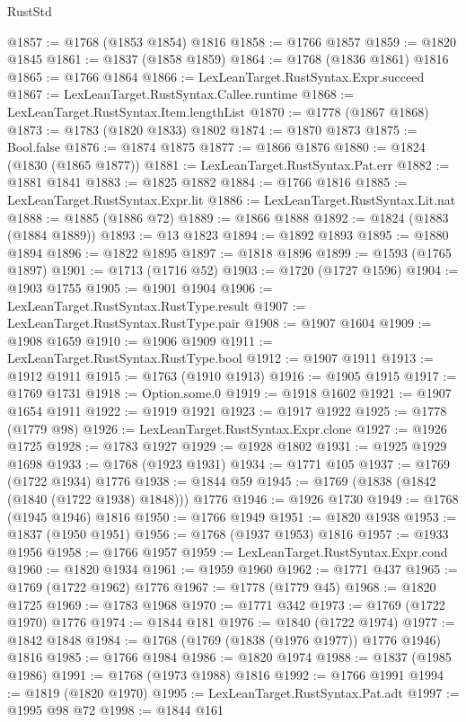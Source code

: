 \begin{lexlean}{RustStd}
\begin{coremodule}
{\begin{coremodule}
{{{{{{{{{{{{{{{{{{{{{{{{{{{{{{{{{{{{{{{{{{{{{{{@1857 := @1768 (@1853 @1854) @1816
@1858 := @1766 @1857
@1859 := @1820 @1845
@1861 := @1837 (@1858 @1859)
@1864 := @1768 (@1836 @1861) @1816
@1865 := @1766 @1864
@1866 := LexLeanTarget.RustSyntax.Expr.succeed
@1867 := LexLeanTarget.RustSyntax.Callee.runtime
@1868 := LexLeanTarget.RustSyntax.Item.lengthList
@1870 := @1778 (@1867 @1868)
@1873 := @1783 (@1820 @1833) @1802
@1874 := @1870 @1873
@1875 := Bool.false
@1876 := @1874 @1875
@1877 := @1866 @1876
@1880 := @1824 (@1830 (@1865 @1877))
@1881 := LexLeanTarget.RustSyntax.Pat.err
@1882 := @1881 @1841
@1883 := @1825 @1882
@1884 := @1766 @1816
@1885 := LexLeanTarget.RustSyntax.Expr.lit
@1886 := LexLeanTarget.RustSyntax.Lit.nat
@1888 := @1885 (@1886 @72)
@1889 := @1866 @1888
@1892 := @1824 (@1883 (@1884 @1889))
@1893 := @13 @1823
@1894 := @1892 @1893
@1895 := @1880 @1894
@1896 := @1822 @1895
@1897 := @1818 @1896
@1899 := @1593 (@1765 @1897)
@1901 := @1713 (@1716 @52)
@1903 := @1720 (@1727 @1596)
@1904 := @1903 @1755
@1905 := @1901 @1904
@1906 := LexLeanTarget.RustSyntax.RustType.result
@1907 := LexLeanTarget.RustSyntax.RustType.pair
@1908 := @1907 @1604
@1909 := @1908 @1659
@1910 := @1906 @1909
@1911 := LexLeanTarget.RustSyntax.RustType.bool
@1912 := @1907 @1911
@1913 := @1912 @1911
@1915 := @1763 (@1910 @1913)
@1916 := @1905 @1915
@1917 := @1769 @1731
@1918 := Option.some.{0}
@1919 := @1918 @1602
@1921 := @1907 @1654 @1911
@1922 := @1919 @1921
@1923 := @1917 @1922
@1925 := @1778 (@1779 @98)
@1926 := LexLeanTarget.RustSyntax.Expr.clone
@1927 := @1926 @1725
@1928 := @1783 @1927
@1929 := @1928 @1802
@1931 := @1925 @1929 @1698
@1933 := @1768 (@1923 @1931)
@1934 := @1771 @105
@1937 := @1769 (@1722 @1934) @1776
@1938 := @1844 @59
@1945 := @1769 (@1838 (@1842 (@1840 (@1722 @1938) @1848))) @1776
@1946 := @1926 @1730
@1949 := @1768 (@1945 @1946) @1816
@1950 := @1766 @1949
@1951 := @1820 @1938
@1953 := @1837 (@1950 @1951)
@1956 := @1768 (@1937 @1953) @1816
@1957 := @1933 @1956
@1958 := @1766 @1957
@1959 := LexLeanTarget.RustSyntax.Expr.cond
@1960 := @1820 @1934
@1961 := @1959 @1960
@1962 := @1771 @437
@1965 := @1769 (@1722 @1962) @1776
@1967 := @1778 (@1779 @45)
@1968 := @1820 @1725
@1969 := @1783 @1968
@1970 := @1771 @342
@1973 := @1769 (@1722 @1970) @1776
@1974 := @1844 @181
@1976 := @1840 (@1722 @1974)
@1977 := @1842 @1848
@1984 := @1768 (@1769 (@1838 (@1976 @1977)) @1776 @1946) @1816
@1985 := @1766 @1984
@1986 := @1820 @1974
@1988 := @1837 (@1985 @1986)
@1991 := @1768 (@1973 @1988) @1816
@1992 := @1766 @1991
@1994 := @1819 (@1820 @1970)
@1995 := LexLeanTarget.RustSyntax.Pat.adt
@1997 := @1995 @98 @72
@1998 := @1844 @161
}}}}}}}}}}}}}}}}}}}}}}}}}}}}}}}}}}}}}}}}}}}}}}}
\end{coremodule}}
\end{coremodule}
\end{lexlean}
